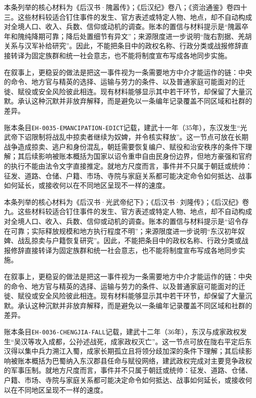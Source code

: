 本条列举的核心材料为《后汉书·隗嚣传》；《后汉纪》卷八；《资治通鉴》卷四十三。这些材料较适合钉住事件的发生、官方表述或特定人物、地点，却不自动构成对全境人口、收入、兵数、信仰或动机的调查。账本的置信与材料提示是“隗嚣卒年和隗纯降期可靠；降后处置细节有异文”；来源限度进一步说明“陇右割据、羌胡关系与汉军补给研究”。因此，不能把条目中的政权名称、行政分类或战报修辞直接转译为固定族群和统一社会意志，也不能将制度宣布写成各地同步实施。

在叙事上，更稳妥的做法是把这一事件视为一条需要地方中介才能运作的链：中央的命令、地方官与精英的选择、运输与劳力的条件、以及普通家庭可能面对的迁徙、赋役或安全风险彼此相连。现有材料能够显示其中若干环节，却保留了大量沉默。承认这种沉默并非放弃解释，而是避免以一条编年记录覆盖不同区域和社群的差异。

账本条目\texttt{EH-0035-EMANCIPATION-EDICT}记载，建武十一年（35年），东汉发生“光武帝下诏限制将战乱中掠卖者继续为奴婢，并令核实释放”。这一节点可放在长期战争造成掠卖、逃户和身份混乱，朝廷需要恢复编户、赋役和治安秩序的条件下理解；其后续影响被账本概括为国家以诏令重申自由民身份边界，但地方豪强和官府的执行不能由法令文字直接推定。就地方尺度而言，事件并不只属于朝廷或统帅：征发、道路、仓储、户籍、市场、寺院与家庭关系都可能决定命令如何抵达、战事如何延长，或接收何以在不同地区呈现不一样的速度。

本条列举的核心材料为《后汉书·光武帝纪下》；《后汉书·刘隆传》；《后汉纪》卷九。这些材料较适合钉住事件的发生、官方表述或特定人物、地点，却不自动构成对全境人口、收入、兵数、信仰或动机的调查。账本的置信与材料提示是“诏令存在可靠；实际释放规模和地方执行程度不明”；来源限度进一步说明“东汉初年奴婢、战乱掠卖与户籍恢复研究”。因此，不能把条目中的政权名称、行政分类或战报修辞直接转译为固定族群和统一社会意志，也不能将制度宣布写成各地同步实施。

在叙事上，更稳妥的做法是把这一事件视为一条需要地方中介才能运作的链：中央的命令、地方官与精英的选择、运输与劳力的条件、以及普通家庭可能面对的迁徙、赋役或安全风险彼此相连。现有材料能够显示其中若干环节，却保留了大量沉默。承认这种沉默并非放弃解释，而是避免以一条编年记录覆盖不同区域和社群的差异。

账本条目\texttt{EH-0036-CHENGJIA-FALL}记载，建武十二年（36年），东汉与成家政权发生“吴汉等攻入成都，公孙述战死，成家政权灭亡”。这一节点可放在陇右平定后东汉得以集中兵力溯江入蜀，成家长期孤立且将领分歧加深的条件下理解；其后续影响被账本概括为巴蜀纳入东汉郡县任命与赋役网络，建武政权完成对主要竞争政权的军事压制。就地方尺度而言，事件并不只属于朝廷或统帅：征发、道路、仓储、户籍、市场、寺院与家庭关系都可能决定命令如何抵达、战事如何延长，或接收何以在不同地区呈现不一样的速度。

